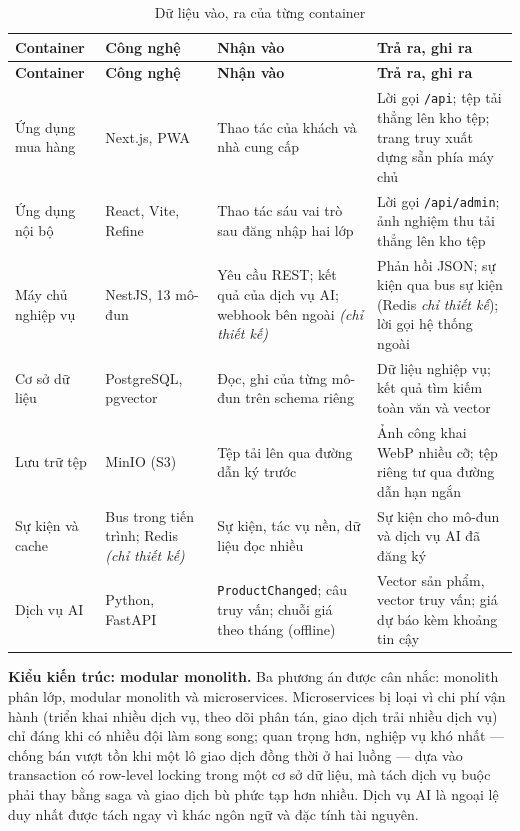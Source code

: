 \begingroup
\tblsetup\tblzebra
\begin{longtable}{L{2.60cm} L{2.40cm} L{5.00cm} L{4.85cm}}
\caption{Dữ liệu vào, ra của từng container}
\label{tab:container-io} \\
\toprule
{}
\textbf{Container} & \textbf{Công nghệ} & \textbf{Nhận vào} & \textbf{Trả ra, ghi ra} \\
\midrule
\endfirsthead
\toprule
{}
\textbf{Container} & \textbf{Công nghệ} & \textbf{Nhận vào} & \textbf{Trả ra, ghi ra} \\
\midrule
\endhead
\bottomrule
\endfoot
Ứng dụng mua hàng & Next.js, PWA & Thao tác của khách và nhà cung cấp & Lời gọi \texttt{/api}; tệp tải thẳng lên kho tệp; trang truy xuất dựng sẵn phía máy chủ \\
Ứng dụng nội bộ & React, Vite, Refine & Thao tác sáu vai trò sau đăng nhập hai lớp & Lời gọi \texttt{/api/admin}; ảnh nghiệm thu tải thẳng lên kho tệp \\
Máy chủ nghiệp vụ & NestJS, 13 mô-đun & Yêu cầu REST; kết quả của dịch vụ AI; webhook bên ngoài \emph{(chỉ thiết kế)} & Phản hồi JSON; sự kiện qua bus sự kiện (Redis \emph{chỉ thiết kế}); lời gọi hệ thống ngoài \\
Cơ sở dữ liệu & PostgreSQL, pgvector & Đọc, ghi của từng mô-đun trên schema riêng & Dữ liệu nghiệp vụ; kết quả tìm kiếm toàn văn và vector \\
Lưu trữ tệp & MinIO (S3) & Tệp tải lên qua đường dẫn ký trước & Ảnh công khai WebP nhiều cỡ; tệp riêng tư qua đường dẫn hạn ngắn \\
Sự kiện và cache & Bus trong tiến trình; Redis \emph{(chỉ thiết kế)} & Sự kiện, tác vụ nền, dữ liệu đọc nhiều & Sự kiện cho mô-đun và dịch vụ AI đã đăng ký \\
Dịch vụ AI & Python, FastAPI & \texttt{ProductChanged}; câu truy vấn; chuỗi giá theo tháng (offline) & Vector sản phẩm, vector truy vấn; giá dự báo kèm khoảng tin cậy \\
\end{longtable}
\endgroup

\noindent\textbf{Kiểu kiến trúc: modular monolith.} Ba phương án được cân nhắc: monolith phân lớp, modular monolith và microservices. Microservices bị loại vì chi phí vận hành (triển khai nhiều dịch vụ, theo dõi phân tán, giao dịch trải nhiều dịch vụ) chỉ đáng khi có nhiều đội làm song song; quan trọng hơn, nghiệp vụ khó nhất --- chống bán vượt tồn khi một lô giao dịch đồng thời ở hai luồng --- dựa vào transaction có row-level locking trong một cơ sở dữ liệu, mà tách dịch vụ buộc phải thay bằng saga và giao dịch bù phức tạp hơn nhiều. Dịch vụ AI là ngoại lệ duy nhất được tách ngay vì khác ngôn ngữ và đặc tính tài nguyên.

